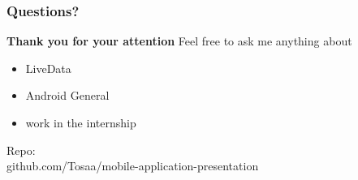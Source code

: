 \documentclass{beamer}
\begin{document}
		\begin{frame}
		\frametitle{Questions?}
		\textbf{Thank you for your attention}
		\linebreak
		Feel free to ask me anything about
		\begin{itemize}
		\item LiveData
		\item Android General
		\item work in the internship
		\end{itemize}
		Repo:\\
		github.com/Tosaa/mobile-application-presentation
		
	\end{frame}
	
\end{document}
